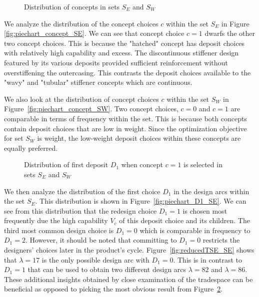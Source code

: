 \begin{figure}[h!]
	\centering
	\caption{Distribution of concepts in sets $S_E$ and $S_W$}
	\label{fig:piechart_concept}
\end{figure}

We analyze the distribution of the concept choices $c$ within the set $S_E$ in Figure \ref{fig:piechart_concept_SE}. We can see that concept choice $c=1$ dwarfs the other two concept choices. This is because the "hatched" concept has deposit choices with relatively high capability and excess. The discontinuous stiffener design featured by its various deposits provided sufficient reinforcement without overstiffening the outercasing. This contrasts the deposit choices available to the "wavy" and "tubular" stiffener concepts which are continuous.

We also look at the distribution of concept choices $c$ within the set $S_W$ in Figure~\ref{fig:piechart_concept_SW}. Two concept choices, $c=0$ and $c=1$ are comparable in terms of frequency within the set. This is because both concepts contain deposit choices that are low in weight. Since the optimization objective for set $S_W$ is weight, the low-weight deposit choices within these concepts are equally preferred.

\begin{figure}[h!]
	\centering
	\caption{Distribution of first deposit $D_1$ when concept $c=1$ is selected in sets $S_E$ and $S_W$}
	\label{fig:piechart_D1}
\end{figure}

We then analyze the distribution of the first choice $D_1$ in the design arcs within the set $S_E$. This distribution is shown in Figure~\ref{fig:piechart_D1_SE}. We can see from this distribution that the redesign choice $D_1 = 1$ is chosen most frequently due the high capability $V_c$ of this deposit choice and its children. The third most common design choice is $D_1 = 0$ which is comparable in frequency to $D_1 = 2$. However, it should be noted that committing to $D_1 = 0$ restricts the designers' choices later in the product's cycle. Figure~\ref{fig:reducedTSE_SE} shows that $\lambda = 17$ is the only possible design arc with $D_1 = 0$. This is in contrast to $D_1 = 1$ that can be used to obtain two different design arcs $\lambda = 82$ and $\lambda = 86$. These additional insights obtained by close examination of the tradespace can be beneficial as opposed to picking the most obvious result from Figure~\ref{fig:piechart_D1}.


